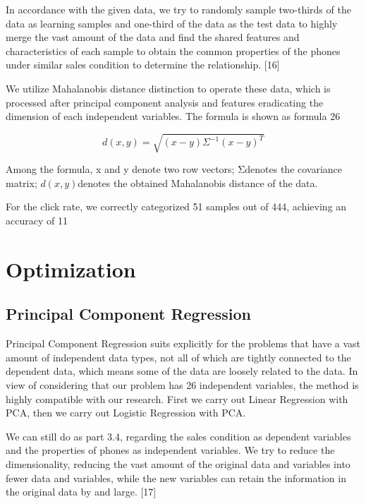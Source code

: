 In accordance with the given data, we try to randomly sample two-thirds of the data as learning samples and one-third of the data as the test data to highly merge the vast amount of the data and find the shared features and characteristics of each sample to obtain the common properties of the phones under similar sales condition to determine the relationship. [16]

We utilize Mahalanobis distance distinction to operate these data, which is processed after principal component analysis and features eradicating the dimension of each independent variables. The formula is shown as formula 26

\begin{equation}
d ( x , y ) = \sqrt { ( x - y ) \Sigma ^ { - 1 } ( x - y ) ^ { T } }
\end{equation}

Among the formula, x and y denote two row vectors; Σdenotes the covariance matrix; $d ( x ,y )$denotes the obtained Mahalanobis distance of the data. 

For the click rate, we correctly categorized 51 samples out of 444, achieving an accuracy of 11%
\section{Optimization}
\subsection{Principal Component Regression}

Principal Component Regression suits explicitly for the problems that have a vast amount of independent data types, not all of which are tightly connected to the dependent data, which means some of the data are loosely related to the data. In view of considering that our problem has 26 independent variables, the method is highly compatible with our research. First we carry out Linear Regression with PCA, then we carry out Logistic Regression with PCA. 

We can still do as part 3.4, regarding the sales condition as dependent variables and the properties of phones as independent variables. We try to reduce the dimensionality, reducing the vast amount of the original data and variables into fewer data and variables, while the new variables can retain the information in the original data by and large. [17]

